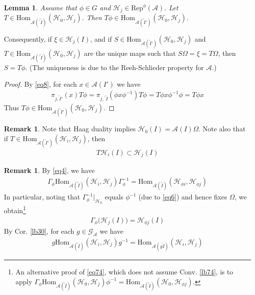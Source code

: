\documentclass[11pt,b5paper,notitlepage]{article}
\theoremstyle{definition}
\newtheorem{rem}[df]{Remark}
\theoremstyle{plain}
\newtheorem{lm}[df]{Lemma}
\newcommand{\wtd}{\widetilde}
\newcommand{\Hom}{\mathrm{Hom}}
\newcommand{\Rep}{\mathrm{Rep}}
\newcommand{\GA}{\mathscr G_{\mathcal A}}
\newcommand{\bpr}{{}^\backprime}
\newcommand{\MA}{\mathcal A}
\newcommand{\MH}{\mathcal H}
\numberwithin{equation}{section}
\begin{document}
\begin{lm}\label{lb17}
Assume that $\phi\in G$ and $\MH_j\in\Rep^\phi(\MA)$. Let $T\in\Hom_{\MA(\bpr\wtd I)}(\MH_0,\MH_j)$. Then $T\phi\in\Hom_{\MA(\wtd I')}(\MH_0,\MH_j)$.
\end{lm}

Consequently, if $\xi\in\MH_j(I)$, and if $S\in\Hom_{\MA(\wtd I')}(\MH_0,\MH_j)$ and $T\in\Hom_{\MA(\bpr\wtd I)}(\MH_0,\MH_j)$ are the unique maps such that $S\Omega=\xi=T\Omega$, then $S=T\phi$. (The uniqueness is due to the Reeh-Schlieder property for $\MA$.)

\begin{proof}
By \eqref{eq8}, for each $x\in\MA(I')$ we have
\begin{align*}
\pi_{j,\wtd I'}(x)T\phi=\pi_{j,\bpr\wtd I}(\phi x\phi^{-1})T\phi=T\phi x\phi^{-1}\phi=T\phi x
\end{align*}
Thus $T\phi\in\Hom_{\MA(\wtd I')}(\MH_0,\MH_j)$. 
\end{proof}

\begin{rem}\label{lb43}
Note that Haag duality implies $\MH_0(I)=\MA(I)\Omega$. Note also that if $T\in\Hom_{\MA(\wtd I')}(\MH_i,\MH_j)$, then
\begin{align*}
T\MH_i(I)\subset\MH_j(I)
\end{align*}
\end{rem}



\begin{rem}\label{lb13}
By \eqref{eq4}, we have
\begin{align}
\Gamma_\phi\Hom_{\MA(\wtd I)}(\MH_i,\MH_j)\Gamma_\phi^{-1}=\Hom_{\MA(\wtd I)}(\MH_{\phi i},\MH_{\phi j})
\end{align}
In particular, noting that $\Gamma_\phi^{-1}|_{\MH_0}$ equals $\phi^{-1}$ (due to \eqref{eq6}) and hence fixes $\Omega$, we obtain\footnote{An alternative proof of \eqref{eq74}, which does not assume Conv. \ref{lb74}, is to apply $\Gamma_\phi\Hom_{\MA(\wtd I)}(\MH_0,\MH_j)\phi^{-1}=\Hom_{\MA(\wtd I)}(\MH_0,\MH_{\phi j})$.}
\begin{align}\label{eq74}
\Gamma_\phi\big(\MH_j(I)\big)=\MH_{\phi j}(I)
\end{align}
By Cor. \ref{lb30}, for each $g\in\GA$ we have
\begin{align}\label{eq76}
g\Hom_{\MA(\wtd I)}(\MH_i,\MH_j) g^{-1}=\Hom_{\MA(g\wtd I)}(\MH_i,\MH_j)
\end{align}
\end{rem}
\end{document}
